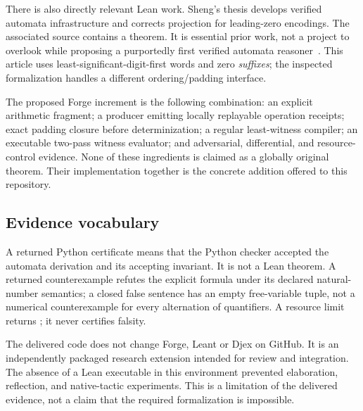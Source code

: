 There is also directly relevant Lean work. Sheng's thesis develops verified automata infrastructure and corrects projection for leading-zero encodings. The associated  source contains a  theorem. It is essential prior work, not a project to overlook while proposing a purportedly first verified automata reasoner~\cite{sheng,aeacu-projection}. This article uses least-significant-digit-first words and zero \emph{suffixes}; the inspected formalization handles a different ordering/padding interface.

The proposed Forge increment is the following combination: an explicit arithmetic fragment; a producer emitting locally replayable operation receipts; exact padding closure before determinization; a regular least-witness compiler; an executable two-pass witness evaluator; and adversarial, differential, and resource-control evidence. None of these ingredients is claimed as a globally original theorem. Their implementation together is the concrete addition offered to this repository.

\subsection{Evidence vocabulary}
A returned Python  certificate means that the Python checker accepted the automata derivation and its accepting invariant. It is not a Lean theorem. A returned counterexample refutes the explicit formula under its declared natural-number semantics; a closed false sentence has an empty free-variable tuple, not a numerical counterexample for every alternation of quantifiers. A resource limit returns ; it never certifies falsity.

The delivered code does not change Forge, Leant or Djex on GitHub. It is an independently packaged research extension intended for review and integration. The absence of a Lean executable in this environment prevented elaboration, reflection, and native-tactic experiments. This is a limitation of the delivered evidence, not a claim that the required formalization is impossible.
